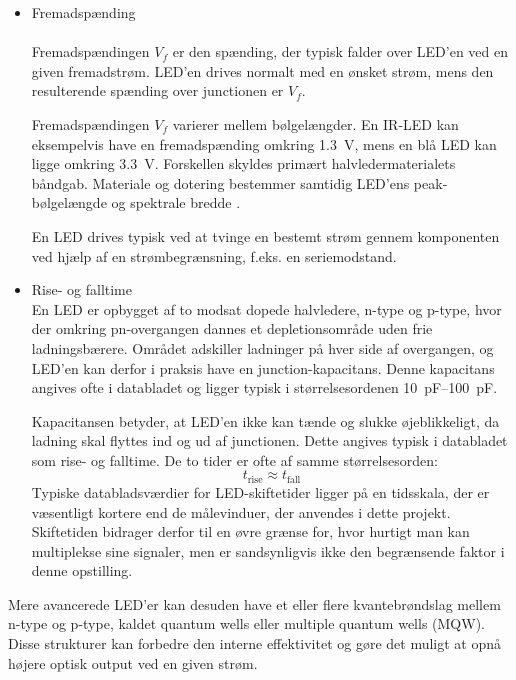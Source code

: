 \begin{itemize}
    \item Fremadspænding \\ \\
    Fremadspændingen $V_f$ er den spænding, der typisk falder over LED'en ved en given fremadstrøm. LED'en drives normalt med en ønsket strøm, mens den resulterende spænding over junctionen er $V_f$.

    Fremadspændingen $V_f$ varierer mellem bølgelængder. En IR-LED kan eksempelvis have en fremadspænding omkring \SI{1.3}{V}, mens en blå LED kan ligge omkring \SI{3.3}{V}. Forskellen skyldes primært halvledermaterialets båndgab. Materiale og dotering bestemmer samtidig LED'ens peak-bølgelængde og spektrale bredde \cite[slide~28]{Jakobsen2025LightSources}.

    En LED drives typisk ved at tvinge en bestemt strøm gennem komponenten ved hjælp af en strømbegrænsning, f.eks. en seriemodstand.

    \item Rise- og falltime \\

    En LED er opbygget af to modsat dopede halvledere, n-type og p-type, hvor der omkring pn-overgangen dannes et depletionsområde uden frie ladningsbærere. Området adskiller ladninger på hver side af overgangen, og LED'en kan derfor i praksis have en junction-kapacitans. Denne kapacitans angives ofte i databladet og ligger typisk i størrelsesordenen \SIrange{10}{100}{pF}.
    
    Kapacitansen betyder, at LED'en ikke kan tænde og slukke øjeblikkeligt, da ladning skal flyttes ind og ud af junctionen. Dette angives typisk i databladet som rise- og falltime. De to tider er ofte af samme størrelsesorden:
    $$
    t_{\mathrm{rise}} \approx t_{\mathrm{fall}}
    $$
    Typiske databladsværdier for LED-skiftetider ligger på en tidsskala, der er væsentligt kortere end de målevinduer, der anvendes i dette projekt. Skiftetiden bidrager derfor til en øvre grænse for, hvor hurtigt man kan multiplekse sine signaler, men er sandsynligvis ikke den begrænsende faktor i denne opstilling.
\end{itemize}

Mere avancerede LED'er kan desuden have et eller flere kvantebrøndslag mellem n-type og p-type, kaldet quantum wells eller multiple quantum wells (MQW). Disse strukturer kan forbedre den interne effektivitet og gøre det muligt at opnå højere optisk output ved en given strøm.

